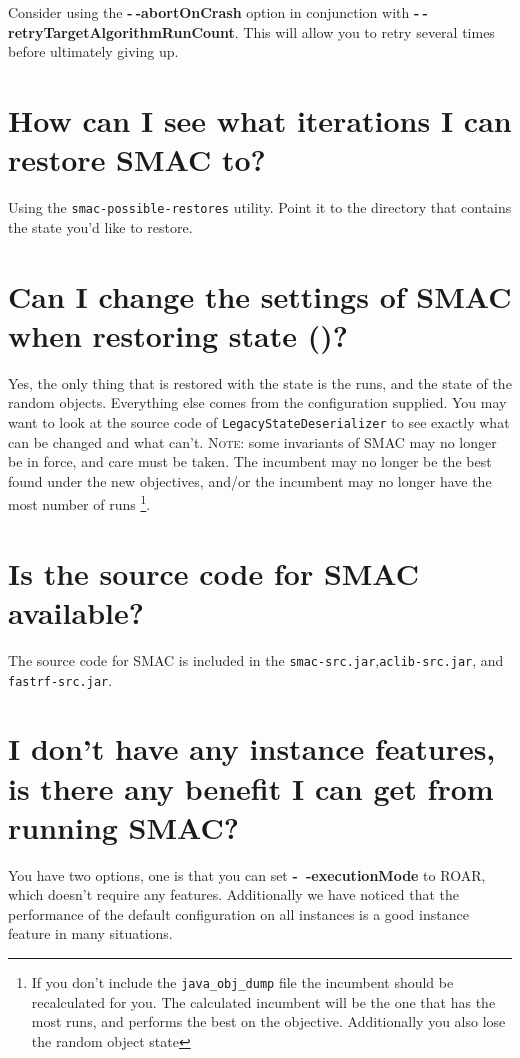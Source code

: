 \documentclass[11pt,letterpaper,oneside]{article}
\begin{document}
	Consider using the \textbf{-$~\!$-abortOnCrash} option in conjunction with \textbf{-$~\!$-retryTargetAlgorithmRunCount}. This will allow you to retry several times before ultimately giving up.


\section{How can I see what iterations I can restore SMAC to?}

	Using the \texttt{smac-possible-restores} utility. Point it to the directory that contains the state you'd like to restore.

\section{Can I change the settings of SMAC when restoring state ()?}

	Yes, the only thing that is restored with the state is the runs, and the state of the random objects. Everything else comes from the configuration supplied. You may want to look at the source code of \texttt{LegacyStateDeserializer} to see exactly what can be changed and what can't. \textsc{Note:} some invariants of SMAC may no longer be in force, and care must be taken. The incumbent may no longer be the best found under the new objectives, and/or the incumbent may no longer have the most number of runs \footnote{If you don't include the \texttt{java\_obj\_dump} file the incumbent should be recalculated for you. The calculated incumbent will be the one that has the most runs, and performs the best on the objective. Additionally you also lose the random object state}. 

\section{Is the source code for SMAC available?}

	The source code for SMAC is included in the \texttt{smac-src.jar},\texttt{aclib-src.jar}, and \texttt{fastrf-src.jar}.

\section{I don't have any instance features, is there any benefit I can get from running SMAC?}

	You have two options, one is that you can set \textbf{-~$\!$-executionMode} to ROAR, which doesn't require any features. Additionally we have noticed that the performance of the default configuration on all instances is a good instance feature in many situations.
	
\end{document}
